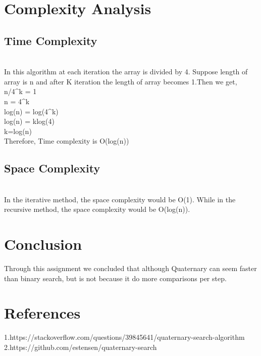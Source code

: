 \documentclass[conference]{IEEEtran}
\begin{document}
\section{Complexity Analysis}
\subsection{Time Complexity}\\
In this algorithm at each iteration the array is divided by 4. Suppose length of array is n and after K iteration the length of array becomes 1.Then we get,\\
n/4^{k} = 1\\
n = 4^{k}\\
log(n) = log(4^{k})\\
log(n) = klog(4)\\
k=log(n)\\

Therefore, Time complexity is O(log(n))\\

\subsection{Space Complexity}\\
In the iterative method, the space complexity would be O(1). While in the recursive method, the space complexity would be O(log(n)). 





\section{Conclusion}
Through this assignment we concluded that although Quaternary can seem faster than binary search, but is not because it do more comparisons per step.



\section{References}
\noindent 1.https://stackoverflow.com/questions/39845641/quaternary-search-algorithm\\
2.https://github.com/estensen/quaternary-search
\end{document}
